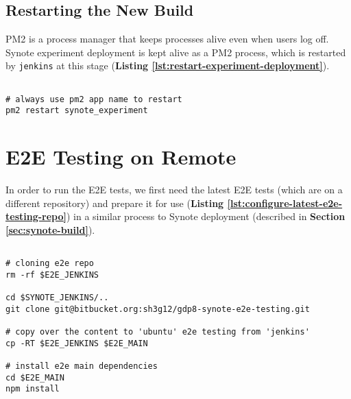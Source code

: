 \subsection{Restarting the New Build}
\label{subsec:restarting-the-new-build}

PM2 is a process manager that keeps processes alive even when users log off. Synote experiment deployment is kept alive as a PM2 process, which is restarted by \texttt{jenkins} at this stage (\textbf{Listing \ref{lst:restart-experiment-deployment}}).

\begin{listing}[H]
\begin{verbatim}

# always use pm2 app name to restart
pm2 restart synote_experiment

\end{verbatim}
\label{lst:restart-experiment-deployment}
\end{listing}

\section{E2E Testing on Remote}
\label{subsec:e2e-testing-on-remote}

In order to run the E2E tests, we first need the latest E2E tests (which are on a different repository) and prepare it for use (\textbf{Listing \ref{lst:configure-latest-e2e-testing-repo}}) in a similar process to Synote deployment (described in \textbf{Section \ref{sec:synote-build}}).

\begin{listing}[H]
\begin{verbatim}

# cloning e2e repo
rm -rf $E2E_JENKINS

cd $SYNOTE_JENKINS/..
git clone git@bitbucket.org:sh3g12/gdp8-synote-e2e-testing.git

# copy over the content to 'ubuntu' e2e testing from 'jenkins'
cp -RT $E2E_JENKINS $E2E_MAIN

# install e2e main dependencies
cd $E2E_MAIN
npm install

\end{verbatim}
\label{lst:configure-latest-e2e-testing-repo}
\end{listing}


